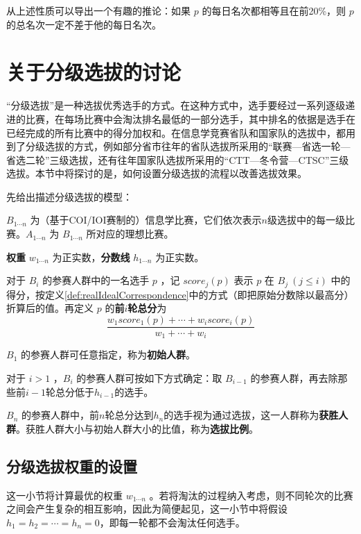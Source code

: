             从上述性质可以导出一个有趣的推论：如果 $p$ 的每日名次都相等且在前20\%，则 $p$ 的总名次一定不差于他的每日名次。

\section{关于分级选拔的讨论}\label{sec:sec6Multilevel}

    “分级选拔”是一种选拔优秀选手的方式。在这种方式中，选手要经过一系列逐级递进的比赛，在每场比赛中会淘汰排名最低的一部分选手，其中排名的依据是选手在已经完成的所有比赛中的得分加权和。在信息学竞赛省队和国家队的选拔中，都用到了分级选拔的方式，例如部分省市往年的省队选拔所采用的“联赛---省选一轮---省选二轮”三级选拔，还有往年国家队选拔所采用的“CTT---冬令营---CTSC”三级选拔。本节中将探讨的是，如何设置分级选拔的流程以改善选拔效果。

    \vspace{1.5ex}

    先给出描述分级选拔的模型：
    \begin{asparaitem}
        \item $B_{1\cdots n}$ 为（基于COI/IOI赛制的）信息学比赛，它们依次表示$n$级选拔中的每一级比赛。$A_{1\cdots n}$ 为 $B_{1\cdots n}$ 所对应的理想比赛。
        \item \textbf{权重} $w_{1\cdots n}$ 为正实数，\textbf{分数线} $h_{1\cdots n}$ 为正实数。
        \item 对于 $B_i$ 的参赛人群中的一名选手 $p$ ，记 $\textit{score}_{j}(p)$ 表示 $p$ 在 $B_j\  (j\leq i)$ 中的得分，按定义\ref{def:realIdealCorrespondence}中的方式（即把原始分数除以最高分）折算后的值。再定义 $p$ 的\textbf{前$i$轮总分}为 $$\frac{w_1\textit{score}_1(p)+\cdots+w_i\textit{score}_i(p)}{w_1+\cdots+w_i}$$
        \item $B_1$ 的参赛人群可任意指定，称为\textbf{初始人群}。
        \item 对于 $i>1$ ，$B_i$ 的参赛人群可按如下方式确定：取 $B_{i-1}$ 的参赛人群，再去除那些前$i-1$轮总分低于$h_{i-1}$的选手。
        \item $B_n$ 的参赛人群中，前$n$轮总分达到$h_n$的选手视为通过选拔，这一人群称为\textbf{获胜人群}。获胜人群大小与初始人群大小的比值，称为\textbf{选拔比例}。
    \end{asparaitem}

    \subsection{分级选拔权重的设置}

        这一小节将计算最优的权重 $w_{1\cdots n}$ 。若将淘汰的过程纳入考虑，则不同轮次的比赛之间会产生复杂的相互影响，因此为简便起见，这一小节中将假设$h_1=h_2=\cdots=h_n=0$，即每一轮都不会淘汰任何选手。

